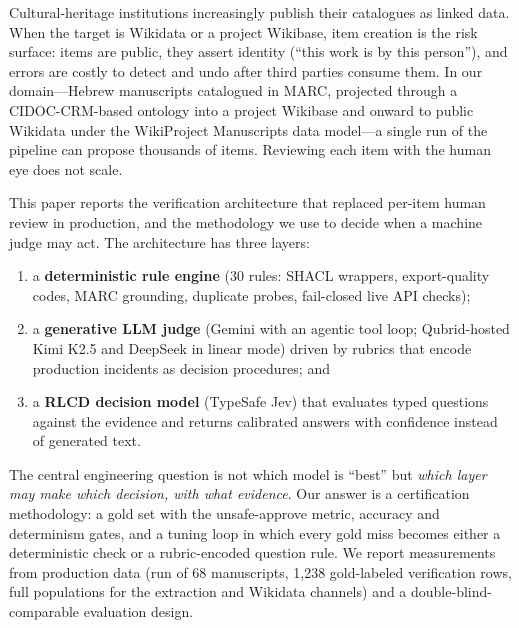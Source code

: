 \documentclass{llncs}
\begin{document}
Cultural-heritage institutions increasingly publish their catalogues as
linked data. When the target is Wikidata or a project Wikibase, item
creation is the risk surface: items are public, they assert identity
(``this work is by this person''), and errors are costly to detect and
undo after third parties consume them. In our domain---Hebrew manuscripts
catalogued in MARC, projected through a CIDOC-CRM-based ontology into a
project Wikibase and onward to public Wikidata under the WikiProject
Manuscripts data model---a single run of the pipeline can propose thousands
of items. Reviewing each item with the human eye does not scale.

This paper reports the verification architecture that replaced per-item
human review in production, and the methodology we use to decide when a
machine judge may act. The architecture has three layers:

\begin{enumerate}
\item a \textbf{deterministic rule engine} (30 rules: SHACL wrappers,
  export-quality codes, MARC grounding, duplicate probes, fail-closed live
  API checks);
\item a \textbf{generative LLM judge} (Gemini with an agentic tool loop;
  Qubrid-hosted Kimi K2.5 and DeepSeek in linear mode) driven by rubrics
  that encode production incidents as decision procedures; and
\item a \textbf{RLCD decision model} (TypeSafe Jev) that evaluates typed
  questions against the evidence and returns calibrated answers with
  confidence instead of generated text.
\end{enumerate}

The central engineering question is not which model is ``best'' but
\emph{which layer may make which decision, with what evidence}. Our answer
is a certification methodology: a gold set with the unsafe-approve metric,
accuracy and determinism gates, and a tuning loop in which every gold miss
becomes either a deterministic check or a rubric-encoded question rule. We
report measurements from production data (run of 68 manuscripts, 1{,}238
gold-labeled verification rows, full populations for the extraction and
Wikidata channels) and a double-blind-comparable evaluation design.
\end{document}
